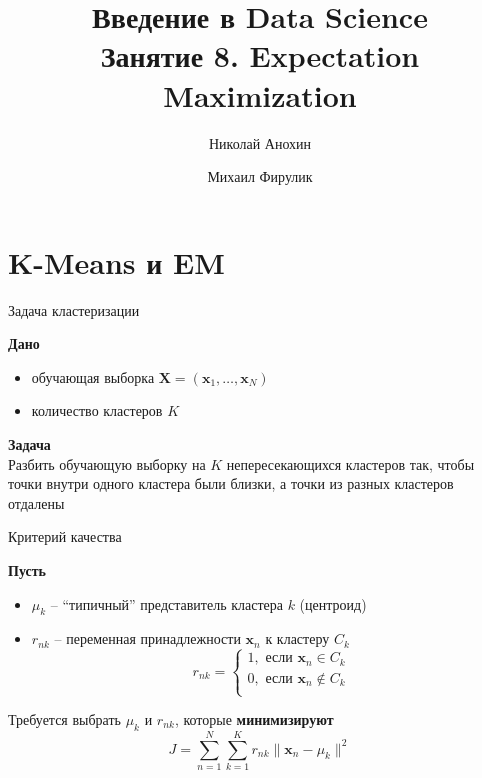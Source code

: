 \documentclass[10pt,a4paper]{beamer}
\author{Николай Анохин \and Михаил Фирулик}
\title{Введение в Data Science \\ Занятие 8. Expectation Maximization}
\begin{document}
\maketitle


\begin{frame}

\tableofcontents

\end{frame}


\section{K-Means и EM}


\begin{frame}{Задача кластеризации}

{\bf Дано} 
\begin{itemize}
\item обучающая выборка $\mathbf{X} = (\mathbf{x}_1, \ldots, \mathbf{x}_N)$
\item количество кластеров $K$
\end{itemize}

\vspace{1em}
{\bf Задача} \\
Разбить обучающую выборку на $K$ непересекающихся кластеров так, чтобы точки внутри одного кластера были близки, а точки из разных кластеров отдалены

\end{frame}


\begin{frame}{Критерий качества}

{\bf Пусть} 
\begin{itemize}
\item $\mu_k$ -- ``типичный'' представитель кластера $k$ (центроид)
\item $r_{nk}$ -- переменная принадлежности $\mathbf{x}_n$ к кластеру $C_k$
\[
r_{nk} = \begin{cases}
1, \text{ если } \mathbf{x}_n \in C_k \\
0, \text{ если } \mathbf{x}_n \not \in C_k \\
\end{cases}
\]
\end{itemize}

\vspace{1em}
Требуется выбрать $\mu_k$ и $r_{nk}$, которые {\bf минимизируют}
\[
J = \sum_{n=1}^N \sum_{k=1}^K r_{nk} \| \mathbf{x}_n - \mu_k \|^2
\]

\end{frame}
\end{document}
